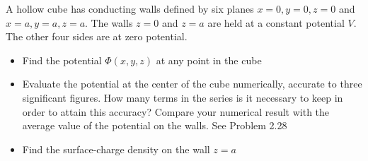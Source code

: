 \documentclass{article}
\begin{document}
\setcounter{problem}{22}
\begin{problem}
A hollow cube has conducting walls defined by six planes $x=0,y=0,z=0$ and $x=a,y=a,z=a$. The walls $z=0$ and $z=a$ are held at a constant potential $V$. The other four sides are at zero potential.
\begin{itemize}
\item Find the potential $\Phi(x,y,z)$ at any point in the cube
\item Evaluate the potential at the center of the cube numerically, accurate to three significant figures. How many terms in the series is it necessary to keep in order to attain this accuracy? Compare your numerical result with the average value of the potential on the walls. See Problem 2.28
\item Find the surface-charge density on the wall $z=a$
\end{itemize}
\end{problem}
\end{document}
